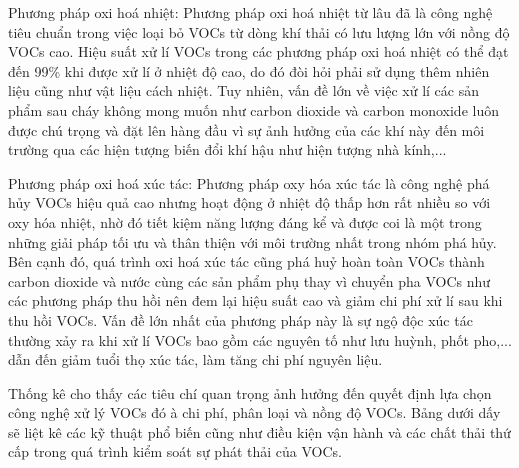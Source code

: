 \documentclass{article} %
\begin{document}
Phương pháp oxi hoá nhiệt: Phương pháp oxi hoá nhiệt từ lâu đã là công nghệ tiêu chuẩn trong việc loại bỏ VOCs từ dòng khí thải có lưu lượng lớn với nồng độ VOCs cao. Hiệu suất xử lí VOCs trong các phương pháp oxi hoá nhiệt có thể đạt đến 99\% khi được xử lí ở nhiệt độ cao, do đó đòi hỏi phải sử dụng thêm nhiên liệu cũng như vật liệu cách nhiệt. Tuy nhiên, vấn đề lớn về việc xử lí các sản phẩm sau cháy không mong muốn như carbon dioxide và carbon monoxide luôn được chú trọng và đặt lên hàng đầu vì sự ảnh hưởng của các khí này đến môi trường qua các hiện tượng biến đổi khí hậu như hiện tượng nhà kính,...

Phương pháp oxi hoá xúc tác: Phương pháp oxy hóa xúc tác là công nghệ phá hủy VOCs hiệu quả cao nhưng hoạt động ở nhiệt độ thấp hơn rất nhiều so với oxy hóa nhiệt, nhờ đó tiết kiệm năng lượng đáng kể và được coi là một trong những giải pháp tối ưu và thân thiện với môi trường nhất trong nhóm phá hủy. Bên cạnh đó, quá trình oxi hoá xúc tác cũng phá huỷ hoàn toàn VOCs thành carbon dioxide và nước cùng các sản phẩm phụ thay vì chuyển pha VOCs như các phương pháp thu hồi nên đem lại hiệu suất cao và giảm chi phí xử lí sau khi thu hồi VOCs. Vấn đề lớn nhất của phương pháp này là sự ngộ độc xúc tác thường xảy ra khi xử lí VOCs bao gồm các nguyên tố như lưu huỳnh, phốt pho,... dẫn đến giảm tuổi thọ xúc tác, làm tăng chi phí nguyên liệu.

Thống kê cho thấy các tiêu chí quan trọng ảnh hưởng đến quyết định lựa chọn công nghệ xử lý VOCs đó à chi phí, phân loại và nồng độ VOCs. Bảng dưới dấy sẽ liệt kê các kỹ thuật phổ biến cũng như điều kiện vận hành và các chất thải thứ cấp trong quá trình kiểm soát sự phát thải của VOCs.
\end{document}
